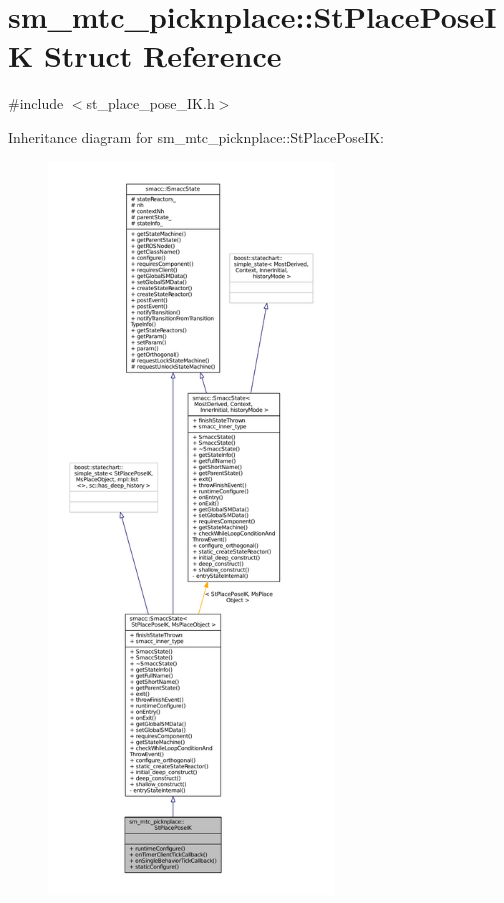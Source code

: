 \hypertarget{structsm__mtc__picknplace_1_1StPlacePoseIK}{}\section{sm\+\_\+mtc\+\_\+picknplace\+:\+:St\+Place\+Pose\+IK Struct Reference}
\label{structsm__mtc__picknplace_1_1StPlacePoseIK}


{\ttfamily \#include $<$st\+\_\+place\+\_\+pose\+\_\+\+I\+K.\+h$>$}



Inheritance diagram for sm\+\_\+mtc\+\_\+picknplace\+:\+:St\+Place\+Pose\+IK\+:
\nopagebreak
\begin{figure}[H]
\begin{center}
\leavevmode
\includegraphics[height=550pt]{structsm__mtc__picknplace_1_1StPlacePoseIK__inherit__graph}
\end{center}
\end{figure}


